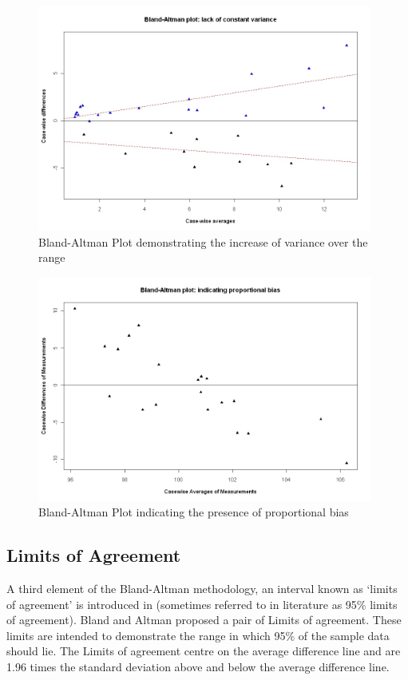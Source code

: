 \documentclass[12pt, a4paper]{report}
\theoremstyle{plain}
\theoremstyle{definition}
\theoremstyle{remark}
\begin{document}
	\begin{figure}[h!]
		\begin{center}
			\includegraphics[width=110mm]{images/BAFanEffect.jpeg}
			\caption{Bland-Altman Plot demonstrating the increase of variance over the range}\label{BAFanEffect}
		\end{center}
	\end{figure}
	
	\begin{figure}[h!]
		\begin{center}
			\includegraphics[width=110mm]{images/PropBias.jpeg}
			\caption{Bland-Altman Plot indicating the presence of proportional bias}\label{PropBias}
		\end{center}
	\end{figure}


\subsection{Limits of Agreement}
A third element of the Bland-Altman methodology, an interval known
as `limits of agreement' is introduced in \citet*{BA86}
(sometimes referred to in literature as 95\% limits of agreement). Bland and Altman proposed a pair of Limits of agreement. These
limits are intended to demonstrate the range in which 95\% of the
sample data should lie. The Limits of agreement centre on the
average difference line and are 1.96 times the standard deviation
above and below the average difference line.
\end{document}
